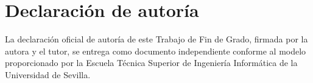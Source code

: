 \chapter{Declaración de autoría}\label{anexo:autoria}

\noindent La declaración oficial de autoría de este Trabajo de Fin de Grado, firmada por la autora y el tutor, se entrega como documento independiente conforme al modelo proporcionado por la Escuela Técnica Superior de Ingeniería Informática de la Universidad de Sevilla.
